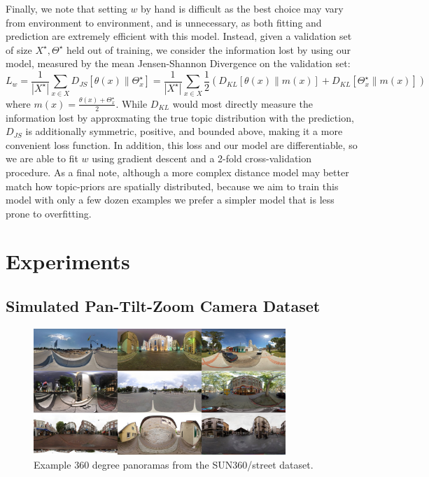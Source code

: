 Finally, we note that setting $w$ by hand is difficult as the best choice may vary from environment to environment, and is unnecessary, as both fitting and prediction are extremely efficient with this model. Instead, given a validation set of size $X^\star, \Theta^\star$ held out of training, we consider the information lost by using our model, measured by the mean Jensen-Shannon Divergence on the validation set:
\begin{equation}
L_w = \frac{1}{|X^\star|} \sum_{x \in X} D_{JS}\left[\theta(x) \| \Theta^\star_x \right]
 =  \frac{1}{|X^\star|} \sum_{x \in X} \frac{1}{2} \left(D_{KL}\left[\theta(x) \| m(x) \right] + D_{KL}\left[\Theta^\star_x \| m(x) \right]\right)
\end{equation}
where $m(x) = \frac{\theta(x)+\Theta^\star_x}{2}$. While $D_{KL}$ would most directly measure the information lost by approxmating the true topic distribution with the prediction, $D_{JS}$ is additionally symmetric, positive, and bounded above, making it a more convenient loss function. In addition, this loss and our model are differentiable, so we are able to fit $w$ using gradient descent and a 2-fold cross-validation procedure. As a final note, although a more complex distance model may better match how topic-priors are spatially distributed, because we aim to train this model with only a few dozen examples we prefer a simpler model that is less prone to overfitting.

\section{Experiments}

\subsection{Simulated Pan-Tilt-Zoom Camera Dataset}
\begin{figure}
    \centering
    \includegraphics[width=0.85\textwidth]{figures/ptz/sun360_9x.jpg}
    \caption{Example 360 degree panoramas from the SUN360/street dataset.}
    \label{fig:sun360_ex}
\end{figure}

